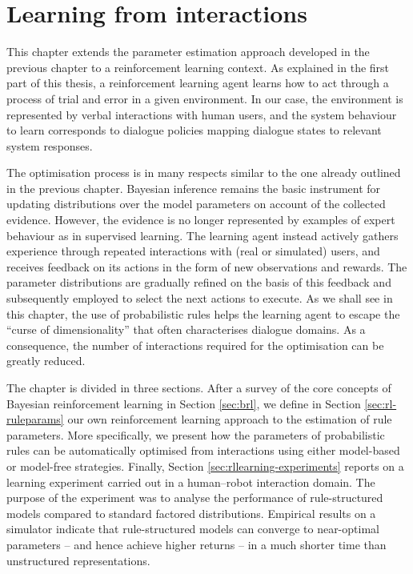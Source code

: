 \chapter{Learning from interactions}
\label{chap:rllearning}
This chapter extends the parameter estimation approach developed in the previous chapter to a reinforcement learning context.  As explained in the first part of this thesis, a reinforcement learning agent learns how to act through a process of trial and error in a given environment.  In our case, the environment is represented by verbal interactions with human users, and the system behaviour to learn corresponds to dialogue policies mapping dialogue states to relevant system responses. 

The optimisation process is in many respects similar to the one already outlined in the previous chapter. Bayesian inference remains the basic instrument for updating distributions over the model parameters on account of the collected evidence.  However, the evidence is no longer represented by examples of expert behaviour as in supervised learning. The learning agent instead actively gathers experience through repeated interactions with (real or simulated) users, and receives feedback on its actions in the form of new observations and rewards. The parameter distributions are gradually refined on the basis of this feedback and subsequently employed to select the next actions to execute. As we shall see in this chapter, the use of probabilistic rules helps the learning agent to escape the ``curse of dimensionality'' that often characterises dialogue domains. As a consequence, the number of interactions required for the optimisation can be greatly reduced. 

The chapter is divided in three sections.  After a survey of the core concepts of Bayesian reinforcement learning in Section \ref{sec:brl}, we define in Section \ref{sec:rl-ruleparams} our own reinforcement learning approach to the estimation of rule parameters.  More specifically, we present how the parameters of probabilistic rules can be automatically optimised from interactions using either model-based or model-free strategies. Finally, Section \ref{sec:rllearning-experiments} reports on a learning experiment carried out in a human--robot interaction domain. The purpose of the experiment was to analyse the performance of rule-structured models compared to standard factored distributions. Empirical results on a simulator indicate that rule-structured models can converge to near-optimal parameters -- and hence achieve higher returns -- in a much shorter time than unstructured representations. 

